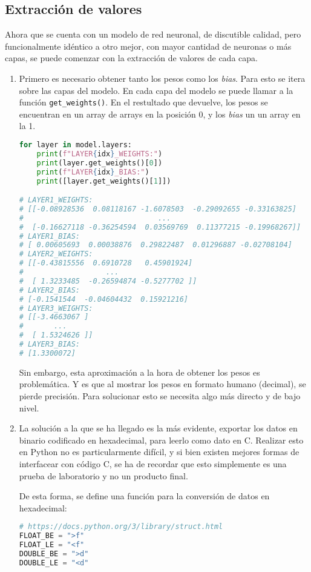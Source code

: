 \subsection{Extracción de valores}
\label{ssec:extraccion_valores}
Ahora que se cuenta con un modelo de red neuronal, de discutible calidad, pero funcionalmente idéntico a otro mejor, con mayor cantidad de neuronas o más capas, se puede comenzar con la extracción de valores de cada capa.

\begin{enumerate}
    \item Primero es necesario obtener tanto los pesos como los \textit{bias}. Para esto se itera sobre las capas del modelo. En cada capa del modelo se puede llamar a la función \texttt{get\_weights()}. En el restultado que devuelve, los pesos se encuentran en un array de arrays en la posición 0, y los \textit{bias} un un array en la 1.\medskip
\begin{lstlisting}[language=Python]
for layer in model.layers:
    print(f"LAYER{idx}_WEIGHTS:")
    print(layer.get_weights()[0])
    print(f"LAYER{idx}_BIAS:")
    print([layer.get_weights()[1]])

# LAYER1_WEIGHTS:
# [[-0.08928536  0.08118167 -1.6078503  -0.29092655 -0.33163825]
#                               ...
#  [-0.16627118 -0.36254594  0.03569769  0.11377215 -0.19968267]]
# LAYER1_BIAS:
# [ 0.00605693  0.00038876  0.29822487  0.01296887 -0.02708104]
# LAYER2_WEIGHTS:
# [[-0.43815556  0.6910728   0.45901924]
#                   ...
#  [ 1.3233485  -0.26594874 -0.5277702 ]]
# LAYER2_BIAS:
# [-0.1541544  -0.04604432  0.15921216]
# LAYER3_WEIGHTS:
# [[-3.4663067 ]
#       ...
#  [ 1.5324626 ]]
# LAYER3_BIAS:
# [1.3300072]
\end{lstlisting}
    Sin embargo, esta aproximación a la hora de obtener los pesos es problemática. Y es que al mostrar los pesos en formato humano (decimal), se pierde precisión. Para solucionar esto se necesita algo más directo y de bajo nivel.
    
    \item La solución a la que se ha llegado es la más evidente, exportar los datos en binario codificado en hexadecimal, para leerlo como dato en C. Realizar esto en Python no es particularmente difícil, y si bien existen mejores formas de interfacear con código C, se ha de recordar que esto simplemente es una prueba de laboratorio y no un producto final.
    
    De esta forma, se define una función para la conversión de datos en hexadecimal:\medskip
\begin{lstlisting}[language=Python]
# https://docs.python.org/3/library/struct.html
FLOAT_BE = ">f"
FLOAT_LE = "<f"
DOUBLE_BE = ">d"
DOUBLE_LE = "<d"


\end{lstlisting}
\end{enumerate}
